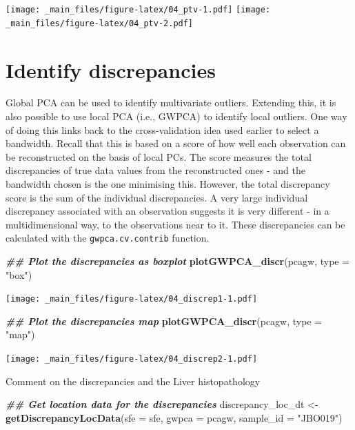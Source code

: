 \documentclass[
]{book}
\newenvironment{Shaded}{\begin{snugshade}}{\end{snugshade}}
\newcommand{\AttributeTok}[1]{\textcolor[rgb]{0.13,0.29,0.53}{#1}}
\newcommand{\DocumentationTok}[1]{\textcolor[rgb]{0.56,0.35,0.01}{\textbf{\textit{#1}}}}
\newcommand{\FunctionTok}[1]{\textcolor[rgb]{0.13,0.29,0.53}{\textbf{#1}}}
\newcommand{\NormalTok}[1]{#1}
\newcommand{\OtherTok}[1]{\textcolor[rgb]{0.56,0.35,0.01}{#1}}
\newcommand{\StringTok}[1]{\textcolor[rgb]{0.31,0.60,0.02}{#1}}
\begin{document}
\texttt{[image: \_main\_files/figure-latex/04\_ptv-1.pdf]} \texttt{[image: \_main\_files/figure-latex/04\_ptv-2.pdf]}

\hypertarget{identify-discrepancies}{%
\section{Identify discrepancies}\label{identify-discrepancies}}

Global PCA can be used to identify multivariate outliers. Extending this, it is also possible to use local PCA (i.e., GWPCA) to identify local outliers. One way of doing this links back to the cross-validation idea used earlier to select a bandwidth. Recall that this is based on a score of how well each observation can be reconstructed on the basis of local PCs. The score measures the total discrepancies of true data values from the reconstructed ones - and the bandwidth chosen is the one minimising this. However, the total discrepancy score is the sum of the individual discrepancies. A very large individual discrepancy associated with an observation suggests it is very different - in a multidimensional way, to the observations near to it. These discrepancies can be calculated with the \texttt{gwpca.cv.contrib} function.

\begin{Shaded}
\begin{Highlighting}[]
\DocumentationTok{\#\# Plot the discrepancies as boxplot}
\FunctionTok{plotGWPCA\_discr}\NormalTok{(pcagw, }\AttributeTok{type =} \StringTok{"box"}\NormalTok{)}
\end{Highlighting}
\end{Shaded}

\texttt{[image: \_main\_files/figure-latex/04\_discrep1-1.pdf]}

\begin{Shaded}
\begin{Highlighting}[]
\DocumentationTok{\#\# Plot the discrepancies map}
\FunctionTok{plotGWPCA\_discr}\NormalTok{(pcagw, }\AttributeTok{type =} \StringTok{"map"}\NormalTok{)}
\end{Highlighting}
\end{Shaded}

\texttt{[image: \_main\_files/figure-latex/04\_discrep2-1.pdf]}

Comment on the discrepancies and the Liver histopathology

\begin{Shaded}
\begin{Highlighting}[]
\DocumentationTok{\#\# Get location data for the discrepancies}
\NormalTok{discrepancy\_loc\_dt }\OtherTok{\textless{}{-}} \FunctionTok{getDiscrepancyLocData}\NormalTok{(}\AttributeTok{sfe =}\NormalTok{ sfe, }
                                            \AttributeTok{gwpca =}\NormalTok{ pcagw, }
                                            \AttributeTok{sample\_id =} \StringTok{"JBO019"}\NormalTok{)}
\end{Highlighting}
\end{Shaded}
\end{document}
